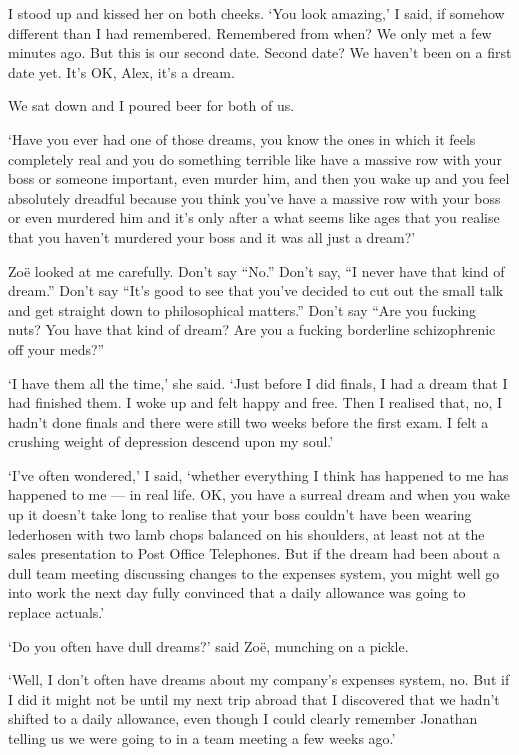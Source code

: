 I stood up and kissed her on both cheeks. `You look amazing,' I
said, if somehow different than I had remembered. Remembered from
when? We only met a few minutes ago. But this is our second date.
Second date? We haven't been on a first date yet. It's OK, Alex,
it's a dream.

We sat down and I poured beer for both of us.

`Have you ever had one of those dreams, you know the ones in which
it feels completely real and you do something terrible like have a
massive row with your boss or someone important, even murder him, and then
you wake up and you feel absolutely dreadful because you think
you've have a massive row with your boss or even murdered him and it's only after a what seems like ages that you realise that you haven't
murdered your boss and it was all just a dream?'

Zo{\"e} looked at me carefully. Don't say ``No.'' Don't say, ``I never
have that kind of dream.'' Don't say ``It's good to see that you've
decided to cut out the small talk and get straight down to
philosophical matters.'' Don't say ``Are you fucking nuts? You have
that kind of dream? Are you a fucking borderline schizophrenic off
your meds?''

`I have them all the time,' she said. `Just before I did finals,
I had a dream that I had finished them. I woke up and felt
happy and free. Then I realised that, no, I hadn't done finals and
there were still two weeks before the first exam. I felt a
crushing weight of depression descend upon my soul.'

`I've often wondered,' I said, `whether everything I think has
happened to me has happened to me --- in real life. OK, you have a
surreal dream and when you wake up it doesn't take long to realise
that your boss couldn't have been wearing lederhosen with two lamb
chops balanced on his shoulders, at least not at the sales presentation to
Post Office Telephones. But if the dream had been about a dull team
meeting discussing changes to the expenses system, you might well go
into work the next day fully convinced that a daily allowance was
going to replace actuals.'

`Do you often have dull dreams?' said Zo{\"e}, munching on a pickle.

`Well, I don't often have dreams about my company's expenses system,
no. But if I did it might not be until my next trip abroad that I
discovered that we hadn't shifted to a daily allowance, even though I could
clearly remember Jonathan telling us we were going to in a team
meeting a few weeks ago.'

